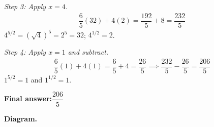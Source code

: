 \documentclass[11pt]{article}
\begin{document}
\textit{Step 3: Apply \( x = 4 \).}
\[\begin{gathered}
\dfrac{6}{5}(32) + 4(2) = \dfrac{192}{5} + 8 = \dfrac{232}{5}
\end{gathered}\]
\( 4^{5/2} = (\sqrt{4})^5 = 2^5 = 32 \); \( 4^{1/2} = 2 \).

\textit{Step 4: Apply \( x = 1 \) and subtract.}
\[\begin{gathered}
\dfrac{6}{5}(1) + 4(1) = \dfrac{6}{5} + 4 = \dfrac{26}{5} \implies \dfrac{232}{5} - \dfrac{26}{5} = \dfrac{206}{5}
\end{gathered}\]
\( 1^{5/2} = 1 \) and \( 1^{1/2} = 1 \).

\begin{answerbox}
\textbf{Final answer:}\quad \(\displaystyle \dfrac{206}{5}\)
\end{answerbox}
\textbf{Diagram.}
\end{document}
